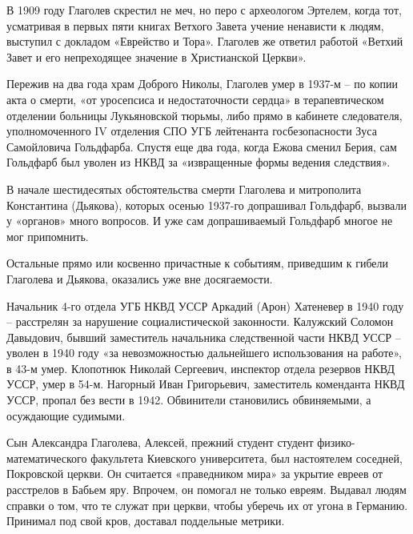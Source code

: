 В 1909 году Глаголев скрестил не меч, но перо с археологом Эртелем, когда тот, усматривая в первых пяти книгах Ветхого Завета учение ненависти к людям, выступил с докладом «Еврейство и Тора». Глаголев же ответил работой «Ветхий Завет и его непреходящее значение в Христианской Церкви».

Пережив на два года храм Доброго Николы, Глаголев умер в 1937-м – по копии акта о смерти, «от уросепсиса и недостаточности сердца» в терапевтическом отделении больницы Лукьяновской тюрьмы, либо прямо в кабинете следователя, уполномоченного IV отделения СПО УГБ лейтенанта госбезопасности Зуса Самойловича Гольдфарба. Спустя еще два года, когда Ежова сменил Берия, сам Гольдфарб был уволен из НКВД за «извращенные формы ведения следствия».

В начале шестидесятых обстоятельства смерти Глаголева и митрополита Константина (Дьякова), которых осенью 1937-го допрашивал Гольдфарб, вызвали у «органов» много вопросов. И уже сам допрашиваемый Гольдфарб многое не мог припомнить. 

Остальные прямо или косвенно причастные к событиям, приведшим к гибели Глаголева и Дьякова, оказались уже вне досягаемости.

Начальник 4-го отдела УГБ НКВД УССР Аркадий (Ар\-он) Хатеневер в 1940 году – расстрелян за нарушение социалистической законности. Калужский Соломон Давыдович, бывший заместитель начальника следственной части НКВД УССР – уволен в 1940 году «за невозможностью дальнейшего использования на работе», в 43-м умер. Клопотнюк Николай Сергеевич, инспектор отдела резервов НКВД УССР, умер в 54-м. Нагорный Иван Григорьевич, заместитель коменданта НКВД УССР, пропал без вести в 1942. Обвинители становились обвиняемыми, а осуждающие судимыми.

Сын Александра Глаголева, Алексей, прежний студент студент физико-математического факультета Киевского университета, был настоятелем соседней, Покровской церкви. Он считается «праведником мира» за укрытие евреев от расстрелов в Бабьем яру. Впрочем, он помогал не только евреям. Выдавал людям справки о том, что те служат при церкви, чтобы уберечь их от угона в Германию. Принимал под свой кров, доставал поддельные метрики.

